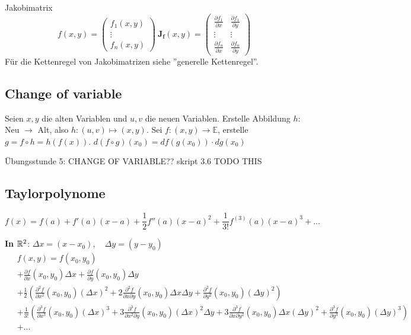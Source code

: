 \begin{Definition}{Jakobimatrix}{}
\[
    f(x, y) =
        \begin{pmatrix}
            f_1(x, y)\\
            \vdots\\
            f_n(x, y)
        \end{pmatrix}\ 
    \mathbf{J_f}(x, y) =
        \begin{pmatrix}
                \frac{\partial f_1}{\partial x} & \frac{\partial f_1}{\partial y}\\
                \vdots&\vdots\\
            \frac{\partial f_n}{\partial x} & \frac{\partial f_n}{\partial y}
        \end{pmatrix}
\]
Für die Kettenregel von Jakobimatrizen siehe ''generelle Kettenregel''.
\end{Definition}

\subsection{Change of variable}

Seien $x, y$ die alten Variablen und $u, v$ die neuen Variablen. Erstelle Abbildung $h:$ Neu $\to$ Alt, also $h: (u, v) \mapsto (x, y)$. Sei $f: (x, y) \to \mathbb{E}$, erstelle $g = f \circ h = h(f(x))$. $d (f \circ g) (x_0) = df(g(x_0)) \cdot dg(x_0)$

Übungsstunde 5: CHANGE OF VARIABLE?? skript 3.6 TODO THIS


\subsection{Taylorpolynome}

\[
    f(x) = f(a) + f'(a)(x-a) + \frac{1}{2} f''(a)(x-a)^2 + \frac{1}{3!} f^{(3)}(a)(x-a)^3 + ...
\]

\textbf{In $\mathbb{R}^2$}: $\Delta x = (x - x_0)$, ~ $\Delta y = (y - y_0)$
\begin{align*}
    \; & f(x, y) =f(x_0, y_0)\\ &+ \frac{\partial f}{\partial x}(x_0,y_0) \Delta x + \frac{\partial f}{\partial y}(x_0,y_0) \Delta y\\
    &+ \frac{1}{2} \left(\frac{\partial^2 f}{\partial x^2}(x_0,y_0) (\Delta x)^2 + 2\frac{\partial^2 f}{\partial x \partial y}(x_0,y_0) \Delta x \Delta y + \frac{\partial^2 f}{\partial y^2}(x_0,y_0) (\Delta y)^2\right)\\
    &+ \frac{1}{3!} \left(\frac{\partial^3 f}{\partial x^3}(x_0,y_0) (\Delta x)^3 + 3\frac{\partial^3 f}{\partial x^2 \partial y}(x_0,y_0) (\Delta x)^2 \Delta y + 3\frac{\partial^3 f}{\partial x \partial y^2}(x_0,y_0) \Delta x (\Delta y)^2 + \frac{\partial^3 f}{\partial y^3}(x_0,y_0) (\Delta y)^3\right)\\
    & + ...
\end{align*}

